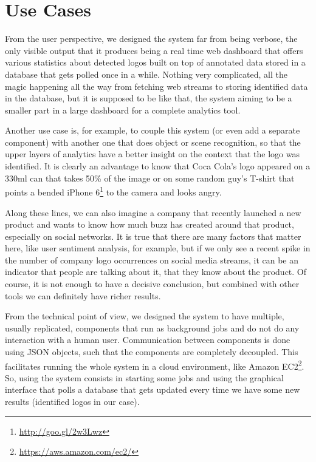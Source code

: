 \section{Use Cases}
\label{sec:proj-use-cases}

From the user perspective, we designed the system far from being verbose,
the only visible output that it produces being a real time web dashboard that
offers various statistics about detected logos built on top of annotated data
stored in a database that gets polled once in a while. Nothing very
complicated, all the magic happening all the way from fetching web streams to
storing identified data in the database, but it is supposed to be like that,
the system aiming to be a smaller part in a large dashboard for a complete
analytics tool. 

Another use case is, for example, to couple this system (or even add a
separate component) with another one that does object or scene recognition, so
that the upper layers of analytics have a better insight on the context that
the logo was identified. It is clearly an advantage to know that Coca Cola's
logo appeared on a 330ml can that takes 50\% of the image or on some random
guy's T-shirt that points a bended iPhone 6\footnote{\url{http://goo.gl/2w3Lwz}}
to the camera and looks angry.

Along these lines, we can also imagine a company that recently launched a new
product and wants to know how much buzz has created around that product,
especially on social networks. It is true that there are many factors that
matter here, like user sentiment analysis, for example, but if we only see a
recent spike in the number of company logo occurrences on social media
streams, it can be an indicator that people are talking about it, that they
know about the product. Of course, it is not enough to have a decisive
conclusion, but combined with other tools we can definitely have richer
results.

From the technical point of view, we designed the system to have multiple,
usually replicated, components that run as background jobs and do not do any
interaction with a human user. Communication between components is done using
JSON objects, such that the components are completely decoupled. This
facilitates running the whole system in a cloud environment, like Amazon
EC2\footnote{\url{https://aws.amazon.com/ec2/}}. So, using the system consists
in starting some jobs and using the graphical interface that polls a database
that gets updated every time we have some new results (identified logos in our
case).


